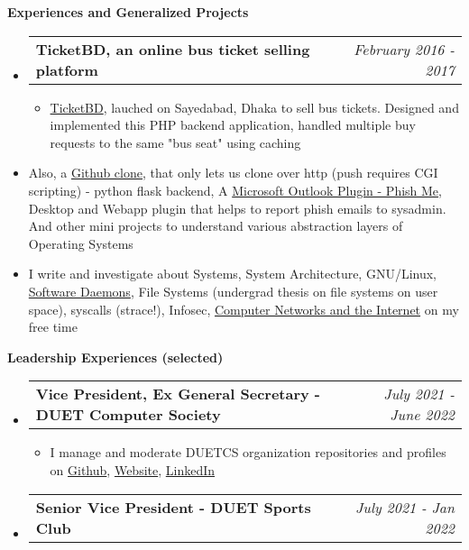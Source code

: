 \documentclass[legalpaper,10pt]{article}
\makeatletter
\newcommand{\resheading}[1]{{\large \colorbox{mygrey}{\begin{minipage}{\textwidth}{\textbf{#1 \vphantom{p\^{E}}}}\end{minipage}}}}
\newcommand{\ressubheading}[4]{
	\begin{tabular*}{7.1in}{l@{\extracolsep{\fill}}r}
		\textbf{#1} & \textit{#4} \\
	\end{tabular*}\vspace{-6pt}}
\makeatother
\begin{document}
	\resheading{Experiences and Generalized Projects}
	\begin{itemize}
	
		\item \ressubheading{TicketBD, an online bus ticket selling platform}{}{}{February 2016 - 2017}
		\begin{itemize} 
			\item \href{https://www.facebook.com/ticketbd.online}{TicketBD}, lauched on Sayedabad, Dhaka to sell bus tickets. Designed and implemented this PHP backend application, handled multiple buy requests to the same "bus seat" using caching
		\end{itemize}

		\item Also, a \href{https://ovebepari.github.io/linux\%7Csystems/i-made-my-own-github-not-really/}{Github clone}, that only lets us clone over http (push requires CGI scripting) - python flask backend, A \href{https://github.com/ovebepari/PhishMe}{Microsoft Outlook Plugin - Phish Me}, Desktop and Webapp plugin that helps to report phish emails to sysadmin. And other mini projects to understand various abstraction layers of Operating Systems
		
		\item I write and investigate about Systems, System Architecture, GNU/Linux, \href{https://ovebepari.github.io/linux\%7Csystems/docker-socket-tale/}{Software Daemons}, File Systems (undergrad thesis on file systems on user space), syscalls (strace!), Infosec, \href{https://ovebepari.github.io/Computer-Networking-Series/}{Computer Networks and the Internet} on my free time
	\end{itemize}

	\vspace{0.15in}
	
	\resheading{Leadership Experiences (selected)}
	\begin{itemize}
		\item \ressubheading{Vice President, Ex General Secretary - DUET Computer Society}{}{}{July 2021 - June 2022}
		\begin{itemize}
		    \item I manage and moderate DUETCS organization repositories and profiles on \href{https://github.com/duetcs}{Github}, \href{https://duetcs.github.io}{Website}, \href{https://www.linkedin.com/company/duet-computer-society}{LinkedIn}
		\end{itemize}
		
		\item \ressubheading{Senior Vice President - DUET Sports Club}{}{}{July 2021 - Jan 2022}
		
	\end{itemize}
\end{document}
